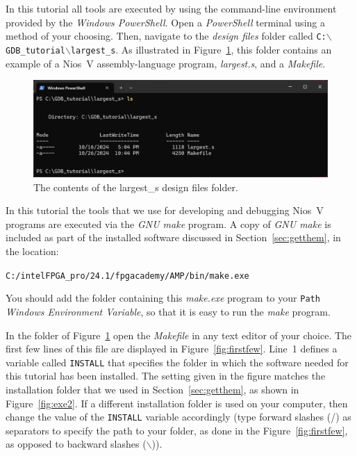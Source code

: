 \documentclass[11pt, twoside, pdftex]{article}
\begin{document}
{In this tutorial all tools are executed by using the command-line environment 
provided by the {\it Windows PowerShell}.
Open a {\it PowerShell} terminal using a method of your choosing.  Then, navigate to the 
{\it design files} folder called \texttt{C:$\backslash$GDB\_tutorial$\backslash$largest\_s}. 
As illustrated in Figure~\ref{fig:largest1}, this folder contains an example of a 
Nios~V assembly-language program, {\it largest.s}, and a {\it Makefile}. 
~\\
\begin{figure}[h]
    \begin{center}
        \includegraphics[width=.9\linewidth]{figures/largest1.png}
        \caption{The contents of the largest\_s design files folder.}
        \label{fig:largest1}
    \end{center}
\end{figure}

In this tutorial the tools that we use for developing and debugging Nios~V programs are 
executed via the {\it GNU make} program. A copy of {\it GNU make} is included as part of
the installed software discussed in Section~\ref{sec:getthem}, in the location:

\texttt{C:/intelFPGA\_pro/24.1/fpgacademy/AMP/bin/make.exe}

You should add the folder containing this {\it make.exe} program to your 
\texttt{Path} {\it Windows Environment Variable}, so
that it is easy to run the {\it make} program.  

In the folder of Figure~\ref{fig:largest1} open the {\it Makefile} in any text editor of your
choice. The first few lines of this file are displayed in Figure~\ref{fig:firstfew}.
Line~1 defines a variable called \texttt{INSTALL} that specifies the folder in which the 
software needed for this tutorial has been installed. The setting given in the figure matches 
the installation folder that we used in Section~\ref{sec:getthem}, as shown in 
Figure~\ref{fig:exe2}. If a different installation folder is used on your computer, then 
change the value of the \texttt{INSTALL} variable accordingly (type forward slashes (/)
as separators to specify the path to your folder, as done in the Figure~\ref{fig:firstfew},
as opposed to backward slashes ($\backslash$)). 

}
\end{document}
